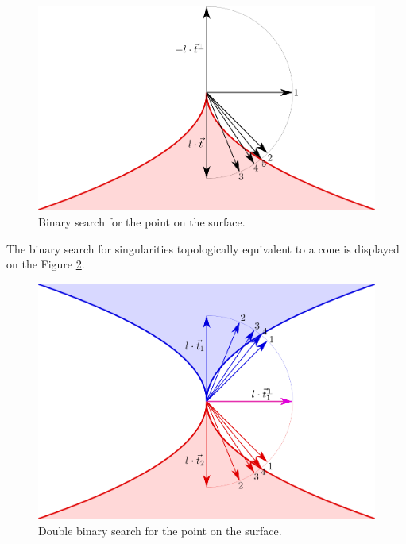 \begin{figure}
    \centerline{\includegraphics[scale=0.5]{images/img41}}
    \caption[Binary search for the point on the surface]
    {Binary search for the point on the surface.}
    \label{img:41}
\end{figure}

The binary search for singularities topologically equivalent to a cone is displayed
on the Figure \ref{img:45}.

\begin{figure}
    \centerline{\includegraphics[scale=0.5]{images/img45}}
    \caption[Double binary search for the point on the surface]
    {Double binary search for the point on the surface.}
    \label{img:45}
\end{figure}

